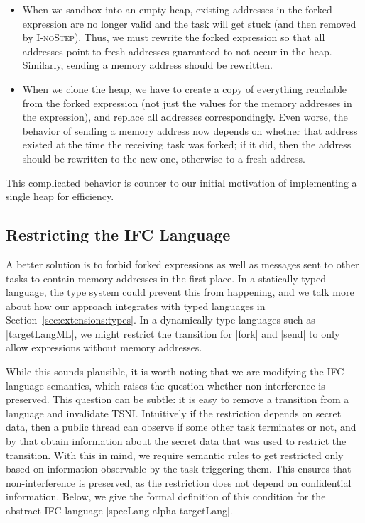 \begin{itemize}
    \item When we sandbox into an empty heap, existing addresses
in the forked expression are no longer valid and the
task will get stuck (and then removed by \textsc{I-noStep}).
Thus, we must rewrite the forked expression so that
all addresses point to fresh addresses
guaranteed to not occur in the heap.  Similarly,
sending a memory address should be rewritten.

\item When we clone the heap, we have to create a copy of everything
reachable from the forked expression (not just the values for
the memory addresses in the expression), and replace all addresses
correspondingly.  Even worse, the behavior of sending a memory address
now depends on whether that address existed at the time the receiving
task was forked;  if it did, then the address should be rewritten to the
new one, otherwise to a fresh address.
\end{itemize}

This complicated behavior is counter to our initial motivation
of implementing a single heap for efficiency.



\subsection{Restricting the IFC Language}

A better solution is to forbid forked expressions as well
as messages sent to other tasks to contain memory addresses in the
first place.  In a statically typed language, the type system could
prevent this from happening, and we talk more about how our
approach integrates with typed languages in
Section~\ref{sec:extensions:types}.
In a dynamically type languages such as |targetLangML|, we might
restrict the transition for |fork| and |send| to only allow expressions
without memory addresses.

While this sounds plausible, it is worth noting that we are modifying the IFC language semantics,
which raises the question whether non-interference is preserved.
This question can be subtle: it is easy to remove a transition from
a language and invalidate TSNI.  Intuitively
if the restriction depends on secret data, then a public thread
can observe if some other task terminates or not, and by that obtain
information about the secret data that was used to restrict the
transition.
With this in mind, we require semantic rules to get restricted only
based on information observable by the task triggering them.
This ensures that non-interference is preserved, as the
restriction does not depend on confidential information.
Below, we give the formal definition of this condition for the
abstract IFC language |specLang alpha targetLang|.

